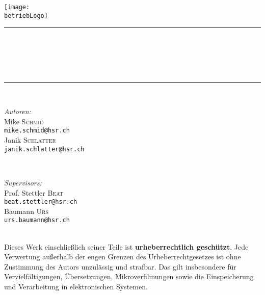 \begin{titlepage}
    \begin{center}
        \texttt{[image: \\betriebLogo]}\\[10ex]

        \rule{\linewidth}{0.5mm}\\[2ex]
        {\huge \bfseries  \titel }\\[2ex]
        {\LARGE \untertitel }\\[2ex]
        {\large \datum}\\
        \rule{\linewidth}{0.5mm}\\[10ex]

        \begin{minipage}[t]{0.4\textwidth}
            \begin{flushleft} 
                \large \emph{Autoren:}\\
                    \large Mike \textsc{Schmid}\\
                    \scriptsize \texttt{mike.schmid@hsr.ch}\\[1ex]
                    \large Janik \textsc{Schlatter}\\
                    \scriptsize \texttt{janik.schlatter@hsr.ch}\\[1ex]
            \end{flushleft}
            \end{minipage}
            ~
            \begin{minipage}[t]{0.4\textwidth}
            \begin{flushright} 
                \large \emph{Supervisors:} \\
                Prof. Stettler \textsc{Beat}\\
                \scriptsize \texttt{beat.stettler@hsr.ch}\\[1ex]
                \large Baumann \textsc{Urs}\\
                \scriptsize \texttt{urs.baumann@hsr.ch}\\[1ex]
            \end{flushright}
        \end{minipage}\\[40ex]

        \small
        \noindent
        Dieses Werk einschließlich seiner Teile ist \textbf{urheberrechtlich geschützt}.
        Jede Verwertung außerhalb der engen Grenzen des Urheberrechtgesetzes ist ohne
        Zustimmung des Autors unzulässig und strafbar. Das gilt insbesondere für
        Vervielfältigungen, Übersetzungen, Mikroverfilmungen sowie die Einspeicherung
        und Verarbeitung in elektronischen Systemen.

    \end{center}
\end{titlepage}